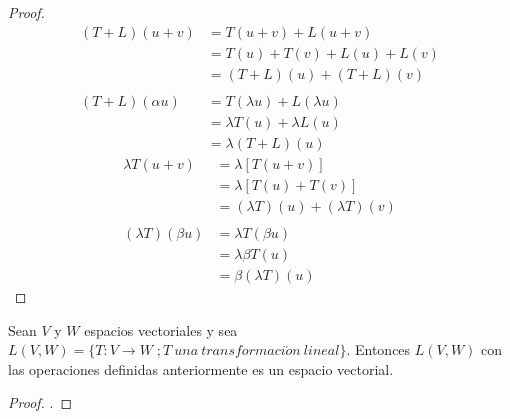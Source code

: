 \begin{proof}
\begin{align*}
(T+L)(u+v) &=T(u+v) + L(u+v)\\
&= T(u) + T(v) + L(u) + L(v)\\
&= (T+L)(u) + (T+L)(v)\\
\\
(T+L)(\alpha u) &= T(\lambda u) + L(\lambda u)\\
&= \lambda T(u)+ \lambda L(u)\\
&= \lambda (T+L)(u) 
\end{align*}
\begin{align*}
\lambda T(u+v) &= \lambda [T(u+v)]\\
&= \lambda [T(u) + T(v)]\\
&= (\lambda T)(u) + (\lambda T)(v)\\
\\
(\lambda T)(\beta u) &= \lambda T(\beta u)\\
&=\lambda \beta T(u)\\
&= \beta (\lambda T)(u)
\end{align*}
\end{proof}

\begin{theorem}
Sean $V$ y $W$ espacios vectoriales y sea $L(V, W) = \{T : V \to W \; ; T \ una \ transformaci\acute{o}n \ lineal\}$. Entonces $L(V, W)$ con las operaciones definidas anteriormente es un espacio vectorial.
\end{theorem}

\begin{proof}
.
\end{proof}

